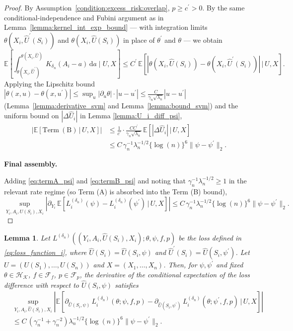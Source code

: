 \documentclass[12pt]{article}
\newtheorem{lemma}{Lemma}%
\newcommand{\E}{\mathbb{E}}
\begin{document}
\begin{proof}
By Assumption~\ref{condition:excess_risk:overlap}, $p\geq c^\prime>0$.  By the same conditional-independence and Fubini argument as in Lemma~\ref{lemma:kernel_int_exp_bound} — with integration limits $\theta(X_i,\widehat U^\prime(S_i))$ and $\theta(X_i,\widehat U(S_i))$ in place of $\theta^\prime$ and $\theta$ — we obtain
$$\E\!\left[\int_{\theta(X_i,\widehat U^\prime)}^{\theta(X_i,\widehat U)}K_{\delta_n}(A_i-a)\,\mathrm{d}a\;\Bigg|\;U,X\right]\leq C^\prime\,\E\!\left[|\theta(X_i,\widehat U(S_i))-\theta(X_i,\widehat U^\prime(S_i))|\,\big|\,U,X\right].$$
Applying the Lipschitz bound $|\theta(x,u)-\theta(x,u^\prime)|\leq \sup_u|\partial_u\theta|\cdot|u-u^\prime|\leq\frac{C}{\gamma_n\sqrt{\lambda_n}}|u-u^\prime|$ (Lemma~\ref{lemma:derivative_svm} and Lemma~\ref{lemma:bound_svm}) and the uniform bound on $|\Delta\widehat U_i|$ in Lemma \ref{lemma:U_i_diff_psi},
\begin{align}
\left|\E\!\left[\mathrm{Term\ (B)}\,\big|\,U,X\right]\right|
&\leq \frac{1}{c^\prime}\cdot\frac{CC^\prime}{\gamma_n\sqrt{\lambda_n}}\,\E\!\left[|\Delta\widehat U_i|\,\big|\,U,X\right]\nonumber\\
&\leq C\,\gamma_n^{-1}\lambda_n^{-1/2}\{\log(n)\}^6\|\psi - \psi^\prime\|_2.
\label{eq:termB_psi}
\end{align}

\noindent\textbf{Final assembly.}

Adding \eqref{eq:termA_psi} and \eqref{eq:termB_psi} and noting that $\gamma_n^{-1}\lambda_n^{-1/2}\geq 1$ in the relevant rate regime (so Term (A) is absorbed into the Term (B) bound),
$$\sup_{Y_i,A_i,\widehat U(S_i),X_i}\left|\partial_{Y_i}\,\E\!\left[L^{(\delta_n)}_i(\psi)-L^{(\delta_n)}_i(\psi^\prime)\,\big|\,U,X\right]\right|
\leq C\,\gamma_n^{-1}\lambda_n^{-1/2}\{\log(n)\}^6\|\psi - \psi^\prime\|_2.$$
\end{proof}


\begin{lemma}\label{lemma:L_i_derivative_U_diff_psi}
    Let $L^{(\delta_n)}((Y_i,A_i,\widehat U(S_i),X_i);\theta,\psi,f,p)$ be the loss defined in \eqref{eq:loss_function_i}, where $\widehat U(S_i)=\widehat U(S_i,\psi)$ and $\widehat U^\prime(S_i)=\widehat U(S_i,\psi^\prime)$. Let $U=(U(S_1),\ldots,U(S_n))$ and $X=(X_1,\ldots,X_n)$. Then, for $\psi,\psi^\prime$ and fixed $\theta\in\mathcal{H}_\mathcal{K}$, $f\in\mathcal{F}_f$, $p\in\mathcal{F}_p$, the derivative of the conditional expectation of the loss difference with respect to $\widehat U(S_i,\psi)$ satisfies
    \begin{align*}
        &\sup_{Y_i,A_i,\widehat U(S_i),X_i}\left|\E\!\left[\partial_{\widehat U(S_i,\psi)}\,L^{(\delta_n)}_i(\theta;\psi,f,p) - \partial_{\widehat U(S_i,\psi^\prime)}\,L^{(\delta_n)}_i(\theta;\psi^\prime,f,p)\,\Big|\,U,X\right]\right|\\
        &\leq C\,(\gamma_n^{-1}+\gamma_n^{-2})\lambda_n^{-1/2}\{\log(n)\}^6\|\psi - \psi^\prime\|_2.
    \end{align*}
\end{lemma}
\end{document}
